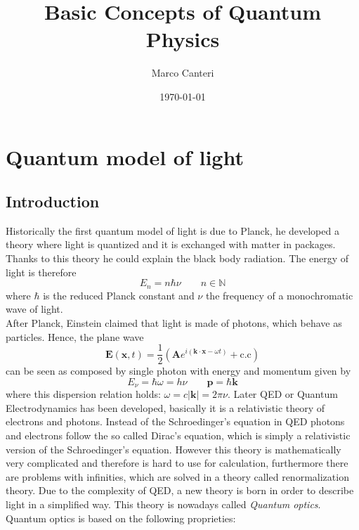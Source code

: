 \documentclass[12pt]{article}
\title{\textbf{Basic Concepts of Quantum Physics}}
\author{Marco Canteri}
\date{\today}
\theoremstyle{plain}
\newcommand{\N}{\mathbb{N}}
\renewcommand{\k}{\mathbf{k}}
\newcommand{\x}{\mathbf{x}}
\newcommand{\p}{\mathbf{p}}
\theoremstyle{definition}
\theoremstyle{remark}
\begin{document}
\maketitle
\tableofcontents
\section{Quantum model of light}
\subsection{Introduction}
Historically the first quantum model of light is due to Planck, he developed a theory where light is quantized and it is exchanged with matter in packages. Thanks to this theory he could explain the black body radiation. The energy of light is therefore
\begin{equation} E_n = n\hbar \nu \qquad n\in \N\end{equation}
where $\hbar$ is the reduced Planck constant and $\nu$ the frequency of a monochromatic wave of light.\\
After Planck, Einstein claimed that light is made of photons, which behave as particles. Hence, the plane wave
\begin{equation}\mathbf{E}(\x,t) = \frac{1}{2}\left(\mathbf{A}e^{i(\k\cdot \x-\omega t)} + \text{c.c}\right)\end{equation}
can be seen as composed by single photon with energy and momentum given by
\begin{equation}E_\nu = \hbar \omega = h\nu \qquad \p = \hbar \k\end{equation}
where this dispersion relation holds: $\omega = c |\k| = 2\pi \nu $. Later QED or Quantum Electrodynamics has been developed, basically it is a relativistic theory of electrons and photons. Instead of the Schroedinger's equation in QED photons and electrons follow the so called Dirac's equation, which is simply a relativistic version of the Schroedinger's equation. However this theory is mathematically very complicated and therefore is hard to use for calculation, furthermore there are problems with infinities, which are solved in a theory called renormalization theory. Due to the complexity of QED, a new theory is born in order to describe light in a simplified way. This theory is nowadays called \emph{Quantum optics}.\\
Quantum optics is based on the following proprieties:
\end{document}
